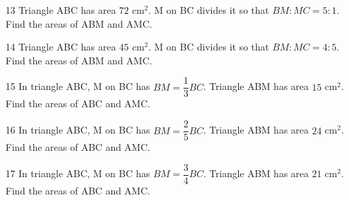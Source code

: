 \gap
\begin{probbox}{13}{\relax}
Triangle ABC has area $72$ cm$^2$. M on BC divides it so that $BM:MC=5:1$. Find the areas of ABM and AMC.
\end{probbox}
\gap
\begin{probbox}{14}{\relax}
Triangle ABC has area $45$ cm$^2$. M on BC divides it so that $BM:MC=4:5$. Find the areas of ABM and AMC.
\end{probbox}
\gap
\begin{probbox}{15}{\relax}
In triangle ABC, M on BC has $BM=\dfrac{1}{3}BC$. Triangle ABM has area $15$ cm$^2$. Find the areas of ABC and AMC.
\end{probbox}
\gap
\begin{probbox}{16}{\relax}
In triangle ABC, M on BC has $BM=\dfrac{2}{5}BC$. Triangle ABM has area $24$ cm$^2$. Find the areas of ABC and AMC.
\end{probbox}
\gap
\begin{probbox}{17}{\relax}
In triangle ABC, M on BC has $BM=\dfrac{3}{4}BC$. Triangle ABM has area $21$ cm$^2$. Find the areas of ABC and AMC.
\end{probbox}
